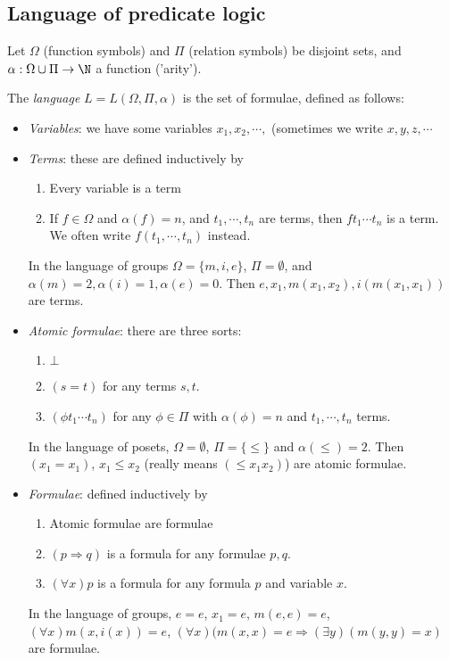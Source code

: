 \documentclass[a4paper]{article}
\begin{document}
\subsection{Language of predicate logic}
\begin{defi}[Language]
  Let $\Omega$ (function symbols) and $\Pi$ (relation symbols) be disjoint sets, and $\alpha : \Omega\cup\Pi \to \N$ a function ('arity').

  The \emph{language} $L = L(\Omega, \Pi, \alpha)$ is the set of formulae, defined as follows:

  \begin{itemize}
    \item \emph{Variables}: we have some variables $x_1, x_2, \cdots, $ (sometimes we write $x, y, z, \cdots$
    \item \emph{Terms}: these are defined inductively by
      \begin{enumerate}
        \item Every variable is a term
        \item If $f\in \Omega$ and $\alpha(f) = n$, and $t_1, \cdots, t_n$ are terms, then $ft_1\cdots t_n$ is a term. We often write $f(t_1, \cdots, t_n)$ instead.
      \end{enumerate}
      \begin{eg}
        In the language of groups $\Omega = \{m, i, e\}$, $\Pi = \emptyset$, and $\alpha (m) = 2, \alpha(i) = 1, \alpha(e) = 0$. Then $e, x_1, m(x_1, x_2), i(m(x_1, x_1))$ are terms.
      \end{eg}
    \item \emph{Atomic formulae}: there are three sorts:
      \begin{enumerate}
        \item $\bot$
        \item $(s = t)$ for any terms $s, t$.
        \item $(\phi t_1 \cdots t_n)$ for any $\phi\in \Pi$ with $\alpha(\phi) = n$ and $t_1, \cdots, t_n$ terms.
      \end{enumerate}
      \begin{eg}
        In the language of posets, $\Omega = \emptyset$, $\Pi=\{\leq\}$ and $\alpha(\leq) = 2$. Then $(x_1 = x_1)$, $x_1\leq x_2$ (really means $(\leq x_1x_2)$) are atomic formulae.
      \end{eg}
    \item \emph{Formulae}: defined inductively by
      \begin{enumerate}
        \item Atomic formulae are formulae
        \item $(p \Rightarrow q)$ is a formula for any formulae $p, q$.
        \item $(\forall x) p$ is a formula for any formula $p$ and variable $x$.
      \end{enumerate}
      \begin{eg}
        In the language of groups, $e = e$, $x_1 = e$, $m(e, e) = e$, $(\forall x) m(x, i(x)) = e$, $(\forall x)(m(x, x) = e \Rightarrow (\exists y) (m(y, y) = x)$ are formulae.
      \end{eg}
  \end{itemize}
\end{defi}
\end{document}
